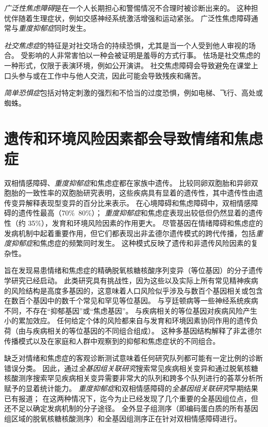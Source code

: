 \textit{广泛性焦虑障碍}是在一个人长期担心和警惕情况不合理时被诊断出来的。
这种担忧伴随着生理症状，例如交感神经系统激活增强和运动紧张。
广泛性焦虑障碍通常与\textit{重度抑郁症}同时发生。


\textit{社交焦虑症}的特征是对社交场合的持续恐惧，尤其是当一个人受到他人审视的场合。
受影响的人非常害怕以一种会被证明是羞辱的方式行事。
怯场是社交焦虑的一种形式，仅限于表演环境，例如公开演讲。
社交焦虑障碍会导致避免在课堂上口头参与或在工作中与他人交流，因此可能会导致残疾和痛苦。



\textit{简单恐惧症}包括对特定刺激的强烈和不恰当的过度恐惧，例如电梯、飞行、高处或蜘蛛。



\section{遗传和环境风险因素都会导致情绪和焦虑症}

双相情感障碍、\textit{重度抑郁症}和焦虑症都在家族中遗传。
比较同卵双胞胎和异卵双胞胎的一致性率的双胞胎研究表明，这些疾病具有显着的遗传性，其中遗传性由遗传变异解释表现型变异的百分比来表示。
在心境障碍和焦虑障碍中，双相情感障碍的遗传性最高（70\%~80\%）；
\textit{重度抑郁症}和焦虑症表现出较低但仍然显着的遗传性（约 35\%），发育和环境风险因素的作用更大。
尽管基因在情绪障碍和焦虑症的发病机制中起着重要作用，但它们都表现出非孟德尔遗传模式的跨代传播，包括\textit{重度抑郁症}和焦虑症的频繁同时发生。
这种模式反映了遗传和非遗传风险因素的复杂性。


旨在发现易患情绪和焦虑症的精确脱氧核糖核酸序列变异（等位基因）的分子遗传学研究已经启动。
此类研究具有挑战性，因为这些以及实际上所有常见精神疾病的风险结构是高度多基因的，这意味着人口风险似乎涉及与数百个基因相关或包含在数百个基因中的数千个常见和罕见等位基因。
与亨廷顿病等一些神经系统疾病不同，不存在“抑郁基因”或“焦虑基因”。
与疾病相关的等位基因对疾病风险产生小的累加效应。
任何给定个体的风险都来自与发育和环境因素协同作用的遗传负荷（由与疾病相关的等位基因的不同组合组成）。
这种多基因结构解释了非孟德尔传播模式以及在家庭和人群中观察到的抑郁和焦虑症状的不同组合。


缺乏对情绪和焦虑症的客观诊断测试意味着任何研究队列都可能有一定比例的诊断错误分类。
因此，通过\textit{全基因组关联研究}搜索常见疾病相关变异和通过脱氧核糖核酸测序搜索罕见疾病相关变异需要非常大的队列和跨多个队列进行的荟萃分析所赋予的显着统计能力。
\textit{重度抑郁症}和双相情感障碍的\textit{全基因组关联研究}早期结果已有报道；
在这两种情况下，迄今为止已经发现了几个重要的全基因组位点，但还不足以确定发病机制的分子途径。
全外显子组测序（即编码蛋白质的所有基因组区域的脱氧核糖核酸测序）和全基因组测序正在针对双相情感障碍进行。


